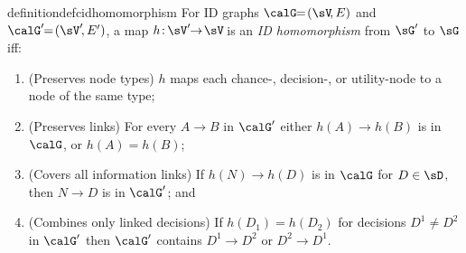 




\newcommand{\preservesnodetypes}{Preserves node types}
\newcommand{\preserveslinks}{Preserves links}
\newcommand{\coversallinfolinks}{Covers all infolinks}
\newcommand{\combinesonlylinkeddecisions}{Combines only linked decisions}








\begin{restatable}[ID homomorphism]{definition}{defcidhomomorphism}
\label{def:CID-homomorphism}
For ID graphs $\calG\!\!=\!(\sV\!,E)$ and $\calG'\!\!=\!(\sV'\!,E')$, a map $h\colon\!\sV' \!\!\to\! \sV\!$ is an \emph{ID homomorphism} from $\sG'$ to $\sG$
iff:
\begin{enumerate}[label=(\alph*)]
    \item 
    (Preserves node types)
    $h$ maps each chance-, decision-, or utility-node to a node of
    the same type; 
    
    \item 
    (Preserves links)
    For every 
    $A \to B$ in $\calG'$
    either
    $h(A) \to h(B)$ is in $\calG$, or $h(A)=h(B)$; 

    \item 
    (Covers all information links)
    If $h(N) \to h(D)$ is in $\calG$ for $D\in \sD$, then $N \to D$ is in $\calG'$; and

    \item 
    (Combines only linked decisions)
    If $h(D_1)\!=\!h(D_2)$ for decisions $D^1\neq D^2$ in $ \calG'$
    then $\calG'$ contains $D^1 \!\!\to\! D^2$ or $D^2 \!\to\! D^1$.
\end{enumerate}
\end{restatable}



